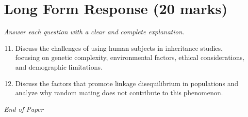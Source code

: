 \documentclass[12pt]{article}
\begin{document}
\section*{Long Form Response (20 marks)}
\textit{Answer each question with a clear and complete explanation.}
\begin{enumerate}[label=\arabic*.]
\setcounter{enumi}{10}
\item Discuss the challenges of using human subjects in inheritance studies, focusing on genetic complexity, environmental factors, ethical considerations, and demographic limitations.
\item Discuss the factors that promote linkage disequilibrium in populations and analyze why random mating does not contribute to this phenomenon.
\end{enumerate}

\vfill
\noindent\textit{End of Paper}
\end{document}
